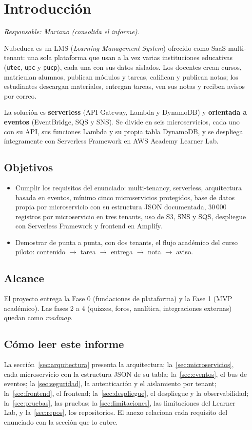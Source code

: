 \section{Introducción}
\textit{Responsable: Mariano (consolida el informe).}

Nubeduca es un LMS (\textit{Learning Management System}) ofrecido como SaaS multi-tenant: una sola
plataforma que usan a la vez varias instituciones educativas (\texttt{utec}, \texttt{upc} y
\texttt{pucp}), cada una con sus datos aislados. Los docentes crean cursos, matriculan alumnos,
publican módulos y tareas, califican y publican notas; los estudiantes descargan materiales,
entregan tareas, ven sus notas y reciben avisos por correo.

La solución es \textbf{serverless} (API Gateway, Lambda y DynamoDB) y \textbf{orientada a eventos}
(EventBridge, SQS y SNS). Se divide en seis microservicios, cada uno con su API, sus funciones Lambda
y su propia tabla DynamoDB, y se despliega íntegramente con Serverless Framework en AWS Academy
Learner Lab.

\subsection{Objetivos}
\begin{itemize}
  \item Cumplir los requisitos del enunciado: multi-tenancy, serverless, arquitectura basada en
        eventos, mínimo cinco microservicios protegidos, base de datos propia por microservicio con su
        estructura JSON documentada, 30\,000 registros por microservicio en tres tenants, uso de S3, SNS
        y SQS, despliegue con Serverless Framework y frontend en Amplify.
  \item Demostrar de punta a punta, con dos tenants, el flujo académico del curso piloto:
        contenido $\rightarrow$ tarea $\rightarrow$ entrega $\rightarrow$ nota $\rightarrow$ aviso.
\end{itemize}

\subsection{Alcance}
El proyecto entrega la Fase 0 (fundaciones de plataforma) y la Fase 1 (MVP académico). Las fases 2 a
4 (quizzes, foros, analítica, integraciones externas) quedan como \textit{roadmap}.

\subsection{Cómo leer este informe}
La sección~\ref{sec:arquitectura} presenta la arquitectura; la~\ref{sec:microservicios}, cada
microservicio con la estructura JSON de su tabla; la~\ref{sec:eventos}, el bus de eventos; la
\ref{sec:seguridad}, la autenticación y el aislamiento por tenant; la~\ref{sec:frontend}, el frontend;
la~\ref{sec:despliegue}, el despliegue y la observabilidad; la~\ref{sec:pruebas}, las pruebas; la
\ref{sec:limitaciones}, las limitaciones del Learner Lab, y la~\ref{sec:repos}, los repositorios. El
anexo relaciona cada requisito del enunciado con la sección que lo cubre.
